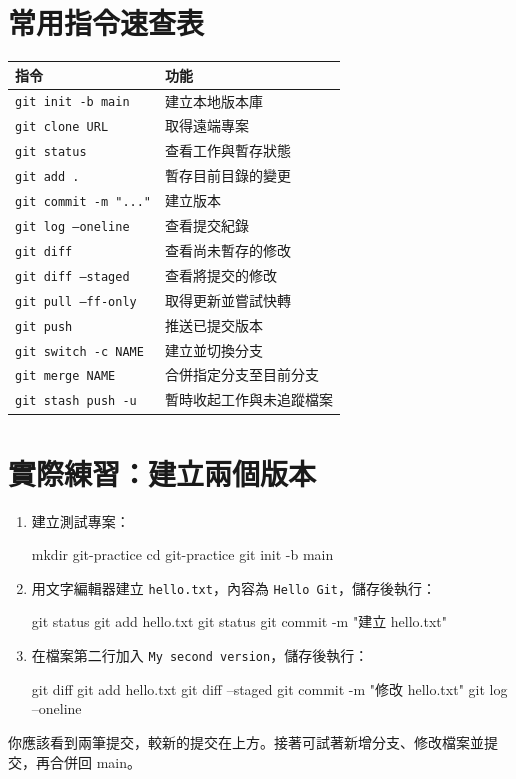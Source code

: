 \documentclass[UTF8,fontset=fandol,11pt,a4paper]{ctexart}
\begin{document}
\section{常用指令速查表}
\begin{tabularx}{\linewidth}{lX}\toprule
    指令                           & 功能           \\\midrule
    \texttt{git init -b main}    & 建立本地版本庫      \\
    \texttt{git clone URL}       & 取得遠端專案       \\
    \texttt{git status}          & 查看工作與暫存狀態    \\
    \texttt{git add .}           & 暫存目前目錄的變更    \\
    \texttt{git commit -m "..."} & 建立版本         \\
    \texttt{git log --oneline}   & 查看提交紀錄       \\
    \texttt{git diff}            & 查看尚未暫存的修改    \\
    \texttt{git diff --staged}   & 查看將提交的修改     \\
    \texttt{git pull --ff-only}  & 取得更新並嘗試快轉    \\
    \texttt{git push}            & 推送已提交版本      \\
    \texttt{git switch -c NAME}  & 建立並切換分支      \\
    \texttt{git merge NAME}      & 合併指定分支至目前分支  \\
    \texttt{git stash push -u}   & 暫時收起工作與未追蹤檔案 \\\bottomrule
\end{tabularx}
\section{實際練習：建立兩個版本}
\begin{enumerate}
    \item 建立測試專案：
          \begin{code}
              mkdir git-practice
              cd git-practice
              git init -b main
          \end{code}
    \item 用文字編輯器建立 \texttt{hello.txt}，內容為 \texttt{Hello Git}，儲存後執行：
          \begin{code}
              git status
              git add hello.txt
              git status
              git commit -m "建立 hello.txt"
          \end{code}
    \item 在檔案第二行加入 \texttt{My second version}，儲存後執行：
          \begin{code}
              git diff
              git add hello.txt
              git diff --staged
              git commit -m "修改 hello.txt"
              git log --oneline
          \end{code}
\end{enumerate}
你應該看到兩筆提交，較新的提交在上方。接著可試著新增分支、修改檔案並提交，再合併回 main。
\end{document}
